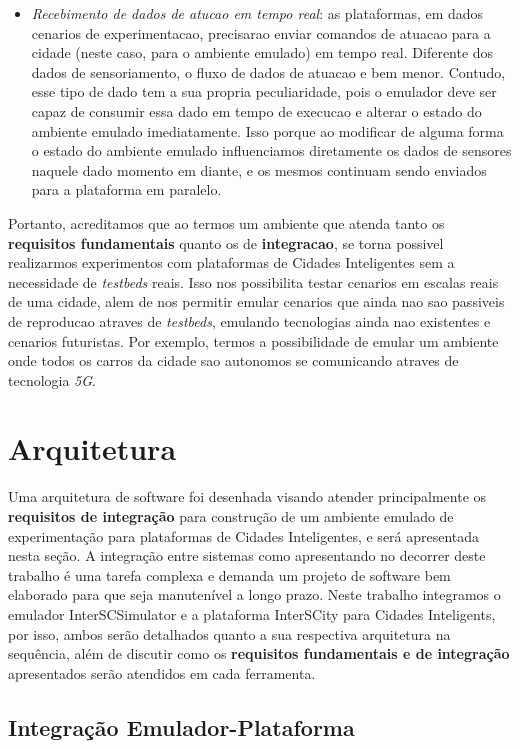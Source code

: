 \begin{itemize}
    \item \textit{Recebimento de dados de atucao em tempo real}: as plataformas, em dados cenarios de experimentacao, precisarao enviar comandos de atuacao para a cidade (neste caso,
        para o ambiente emulado) em tempo real.
        Diferente dos dados de sensoriamento, o fluxo de dados de atuacao e bem menor.
        Contudo, esse tipo de dado tem a sua propria peculiaridade, pois o emulador deve ser capaz de consumir essa dado em tempo de execucao e alterar o estado do ambiente emulado
        imediatamente.
        Isso porque ao modificar de alguma forma o estado do ambiente emulado influenciamos diretamente os dados de sensores naquele dado momento em diante, e os mesmos continuam
        sendo enviados para a plataforma em paralelo.
\end{itemize}

Portanto, acreditamos que ao termos um ambiente que atenda tanto os \textbf{requisitos fundamentais} quanto os de \textbf{integracao}, se torna possivel realizarmos experimentos
com plataformas de Cidades Inteligentes sem a necessidade de \textit{testbeds} reais.
Isso nos possibilita testar cenarios em escalas reais de uma cidade, alem de nos permitir emular cenarios que ainda nao sao passiveis de reproducao atraves de \textit{testbeds},
emulando tecnologias ainda nao existentes e cenarios futuristas.
Por exemplo, termos a possibilidade de emular um ambiente onde todos os carros da cidade sao autonomos se comunicando atraves de tecnologia \textit{5G}.

\section{Arquitetura}

Uma arquitetura de software foi desenhada visando atender principalmente os \textbf{requisitos de integração} para construção de um ambiente emulado de experimentação para plataformas
de Cidades Inteligentes, e será apresentada nesta seção.
A integração entre sistemas como apresentando no decorrer deste trabalho é uma tarefa complexa e demanda um projeto de software bem elaborado para que seja manutenível a longo prazo.
Neste trabalho integramos o emulador InterSCSimulator e a plataforma InterSCity para Cidades Inteligents, por isso, ambos serão detalhados quanto a sua respectiva arquitetura na
sequência, além de discutir como os \textbf{requisitos fundamentais e de integração} apresentados serão atendidos em cada ferramenta.

\subsection{Integração Emulador-Plataforma}

